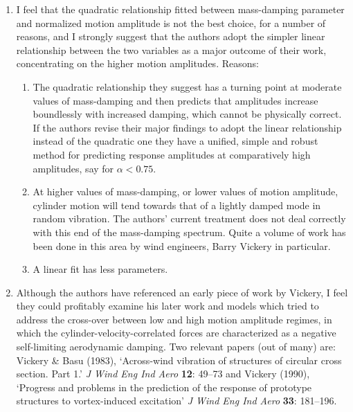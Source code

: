 \documentclass[a4paper,11pt]{article}
\begin{document}
\begin{enumerate}

\item
I feel that the quadratic relationship fitted between mass-damping
parameter and normalized motion amplitude is not the best choice, for a
number of reasons, and I strongly suggest that the authors adopt the
simpler linear relationship between the two variables as a major
outcome of their work, concentrating on the higher motion
amplitudes. Reasons:
\begin{enumerate}
\item
The quadratic relationship they suggest has a turning point at
moderate values of mass-damping and then predicts that amplitudes
increase boundlessly with increased damping, which cannot be
physically correct.  If the authors revise their major findings to
adopt the linear relationship instead of the quadratic one they have a
unified, simple and robust method for predicting response amplitudes
at comparatively high amplitudes, say for $\alpha<0.75$.
\item
At higher values of mass-damping, or lower values of motion amplitude,
cylinder motion will tend towards that of a lightly damped mode in
random vibration. The authors' current treatment does not deal
correctly with this end of the mass-damping spectrum. Quite a volume
of work has been done in this area by wind engineers, Barry Vickery in
particular.
\item
A linear fit has less parameters.
\end{enumerate}

\item
Although the authors have referenced an early piece of work by
Vickery, I feel they could profitably examine his later work and
models which tried to address the cross-over between low and high
motion amplitude regimes, in which the cylinder-velocity-correlated
forces are characterized as a negative self-limiting aerodynamic
damping. Two relevant papers (out of many) are: Vickery \& Basu
(1983), `Across-wind vibration of structures of circular cross
section. Part 1.' \textit{J Wind Eng Ind Aero} \textbf{12}: 49--73 and
Vickery (1990), `Progress and problems in the prediction of the
response of prototype structures to vortex-induced excitation'
\textit{J Wind Eng Ind Aero} \textbf{33}: 181--196.



\end{enumerate}
\end{document}
